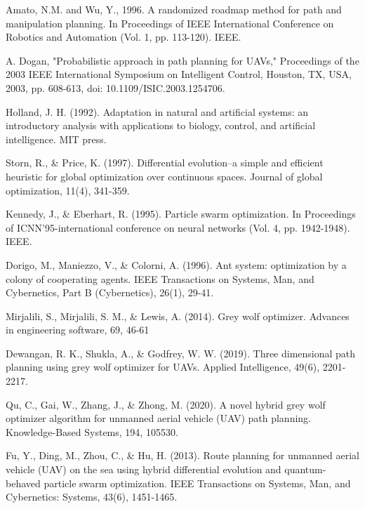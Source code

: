 \documentclass[conference]{IEEEtran}
\begin{document}
\begin{thebibliography}{00}
 Amato, N.M. and Wu, Y., 1996. A randomized roadmap method for path and manipulation planning. In Proceedings of IEEE International Conference on Robotics and Automation (Vol. 1, pp. 113-120). IEEE.

 A. Dogan, "Probabilistic approach in path planning for UAVs," Proceedings of the 2003 IEEE International Symposium on Intelligent Control, Houston, TX, USA, 2003, pp. 608-613, doi: 10.1109/ISIC.2003.1254706.

 Holland, J. H. (1992). Adaptation in natural and artificial systems: an introductory analysis with applications to biology, control, and artificial intelligence. MIT press.

 Storn, R., \& Price, K. (1997). Differential evolution–a simple and efficient heuristic for global optimization over continuous spaces. Journal of global optimization, 11(4), 341-359.

 Kennedy, J., \& Eberhart, R. (1995). Particle swarm optimization. In Proceedings of ICNN'95-international conference on neural networks (Vol. 4, pp. 1942-1948). IEEE.

 Dorigo, M., Maniezzo, V., \& Colorni, A. (1996). Ant system: optimization by a colony of cooperating agents. IEEE Transactions on Systems, Man, and Cybernetics, Part B (Cybernetics), 26(1), 29-41.

 Mirjalili, S., Mirjalili, S. M., \& Lewis, A. (2014). Grey wolf optimizer. Advances in engineering software, 69, 46-61

 Dewangan, R. K., Shukla, A., \& Godfrey, W. W. (2019). Three dimensional path planning using grey wolf optimizer for UAVs. Applied Intelligence, 49(6), 2201-2217.

 Qu, C., Gai, W., Zhang, J., \& Zhong, M. (2020). A novel hybrid grey wolf optimizer algorithm for unmanned aerial vehicle (UAV) path planning. Knowledge-Based Systems, 194, 105530.

 Fu, Y., Ding, M., Zhou, C., \& Hu, H. (2013). Route planning for unmanned aerial vehicle (UAV) on the sea using hybrid differential evolution and quantum-behaved particle swarm optimization. IEEE Transactions on Systems, Man, and Cybernetics: Systems, 43(6), 1451-1465.

\end{thebibliography}
\end{document}
